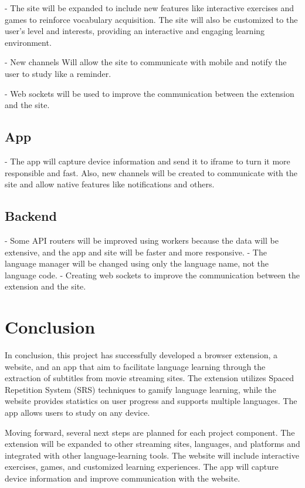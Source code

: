 \documentclass[12pt]{article}
\begin{document}
- The site will be expanded to include new features like interactive exercises and games to reinforce vocabulary acquisition. The site will also be customized to the user's level and interests, providing an interactive and engaging learning environment. 

- New channels Will allow the site to communicate with mobile and notify the user to study like a reminder. 

- Web sockets will be used to improve the communication between the extension and the site.

\subsection{App}

- The app will capture device information and send it to iframe to turn it more responsible and fast. Also, new channels will be created to communicate with the site and allow native features like notifications and others.

\subsection{Backend} 

- Some API routers will be improved using workers because the data will be extensive, and the app and site will be faster and more responsive.
- The language manager will be changed using only the language name, not the language code. 
- Creating web sockets to improve the communication between the extension and the site.

\section{Conclusion}

In conclusion, this project has successfully developed a browser extension, a website, and an app that aim to facilitate language learning through the extraction of subtitles from movie streaming sites. The extension utilizes Spaced Repetition System (SRS) techniques to gamify language learning, while the website provides statistics on user progress and supports multiple languages. The app allows users to study on any device.

Moving forward, several next steps are planned for each project component. The extension will be expanded to other streaming sites, languages, and platforms and integrated with other language-learning tools. The website will include interactive exercises, games, and customized learning experiences. The app will capture device information and improve communication with the website.
\end{document}
